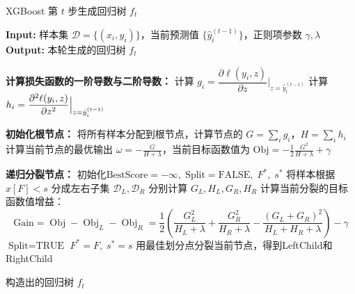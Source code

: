 \begin{algorithm}
	\caption{XGBoost 第 \( t \) 步生成回归树 $f_t$}
	\begin{algorithmic}[1]
		\State \textbf{Input:} 样本集 $\mathcal{D} = \{(x_i, y_i)\}$，当前预测值 $\{\hat{y}_i^{(t-1)}\}$，正则项参数 $\gamma,\lambda$
		\State \textbf{Output:} 本轮生成的回归树 $f_t$
		
		\State \textbf{计算损失函数的一阶导数与二阶导数：}
		\State 计算 $g_i=\dfrac{\partial \ell(y_i,z)}{\partial z}\Big|_{z=\hat{y}_i^{(t-1)}}$
		\State 计算 $h_i=\dfrac{\partial^2 \ell(y_i,z)}{\partial z^2}\Bigl|_{z=\hat{y}_i^{(t-1)}}$
		\EndFor
		
		\State \textbf{初始化根节点：}
		\State 将所有样本分配到根节点，计算节点的 $G = \sum_i g_i$，$H = \sum_i h_i$
		\State 计算当前节点的最优输出 $\omega = -\frac{G}{H + \lambda}$，当前目标函数值为 $\text{Obj} = -\frac{1}{2}\frac{G^2}{H + \lambda} + \gamma$
		
		\State \textbf{递归分裂节点：}
		\State 初始化$\text{BestScore}=-\infty,\;\text{Split}=\text{FALSE},\;F^*,\;s^*$
		\State 将样本根据 $x[F] < s$ 分成左右子集 $\mathcal{D}_L, \mathcal{D}_R$
		\State 分别计算 $G_L, H_L, G_R, H_R$
		\State 计算当前分裂的目标函数值增益：
		\[
		\text{Gain} = \operatorname{Obj}-\operatorname{Obj}_{L}-\operatorname{Obj}_{R}=\frac{1}{2}\left( \frac{G_L^2}{H_L + \lambda} + \frac{G_R^2}{H_R + \lambda} - \frac{(G_L + G_R)^2}{H_L + H_R + \lambda} \right) - \gamma
		\]
		\State $\text{Split}=\text{TRUE}$
		\State $F^*=F,\;s^*=s$
		\EndIf
		\EndIf
		\EndFor
		\EndFor
		\State 用最佳划分点分裂当前节点，得到LeftChild和RightChild
		\State {}
		\State {}
		\EndIf
		\EndFunction
		
		\State \Return 构造出的回归树 $f_t$
	\end{algorithmic}
\end{algorithm}











